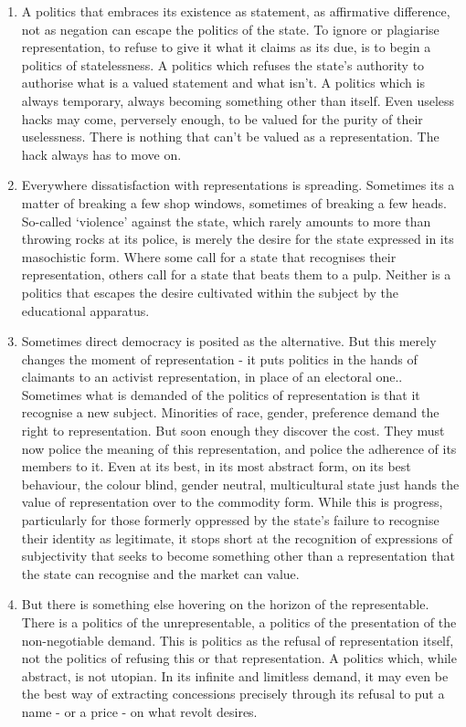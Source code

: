 \documentclass[letterpaper,12pt,english]{sphinxmanual}
\begin{document}
\begin{enumerate}
\item {} 
A politics that embraces its existence as statement, as affirmative difference, not as negation can escape the politics of the state. To ignore or plagiarise representation, to refuse to give it what it claims as its due, is to begin a politics of statelessness. A politics which refuses the state's authority to authorise what is a valued statement and what isn't. A politics which is always temporary, always becoming something other than itself. Even useless hacks may come, perversely enough, to be valued for the purity of their uselessness. There is nothing that can't be valued as a representation. The hack always has to move on.

\item {} 
Everywhere dissatisfaction with representations is spreading. Sometimes its a matter of breaking a few shop windows, sometimes of breaking a few heads. So-called `violence' against the state, which rarely amounts to more than throwing rocks at its police, is merely the desire for the state expressed in its masochistic form. Where some call for a state that recognises their representation, others call for a state that beats them to a pulp. Neither is a politics that escapes the desire cultivated within the subject by the educational apparatus.

\item {} 
Sometimes direct democracy is posited as the alternative. But this merely changes the moment of representation - it puts politics in the hands of claimants to an activist representation, in place of an electoral one.. Sometimes what is demanded of the politics of representation is that it recognise a new subject. Minorities of race, gender, preference demand the right to representation. But soon enough they discover the cost. They must now police the meaning of this representation, and police the adherence of its members to it. Even at its best, in its most abstract form, on its best behaviour, the colour blind, gender neutral, multicultural state just hands the value of representation over to the commodity form. While this is progress, particularly for those formerly oppressed by the state's failure to recognise their identity as legitimate, it stops short at the recognition of expressions of subjectivity that seeks to become something other than a representation that the state can recognise and the market can value.

\item {} 
But there is something else hovering on the horizon of the representable. There is a politics of the unrepresentable, a politics of the presentation of the non-negotiable demand. This is politics as the refusal of representation itself, not the politics of refusing this or that representation. A politics which, while abstract, is not utopian. In its infinite and limitless demand, it may even be the best way of extracting concessions precisely through its refusal to put a name - or a price - on what revolt desires.

\end{enumerate}
\end{document}
